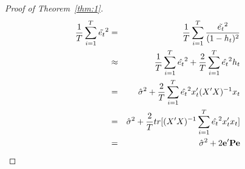 \begin{proof}[Proof of Theorem~\ref{thm:1}]
\begin{eqnarray}
\frac{1}{T} \sum_{i=1}^T \tilde{e_t}^2 & = & \frac{1}{T} \sum_{i=1}^T \frac{\tilde{e_t}^2}{(1-h_t)^2} \nonumber \\
                                        & \approx & \frac{1}{T} \sum_{i=1}^T \hat{e_t}^2 + \frac{2}{T} \sum_{i=1}^T \hat{e_t}^2 h_t \nonumber \\
                                        & = & \hat{\sigma}^2 + \frac{2}{T} \sum_{i=1}^T \hat{e_t}^2 x_t' (X'X)^{-1} x_t \nonumber \\
                                        & = & \hat{\sigma}^2 + \frac{2}{T} tr[(X'X)^{-1} \sum_{i=1}^T \hat{e_t}^2 x_t'x_t] \nonumber \\
                                        & = & \hat{\sigma}^2 + 2 \bold{e}' \bold{P} \bold{e}
\end{eqnarray}
\end{proof}
